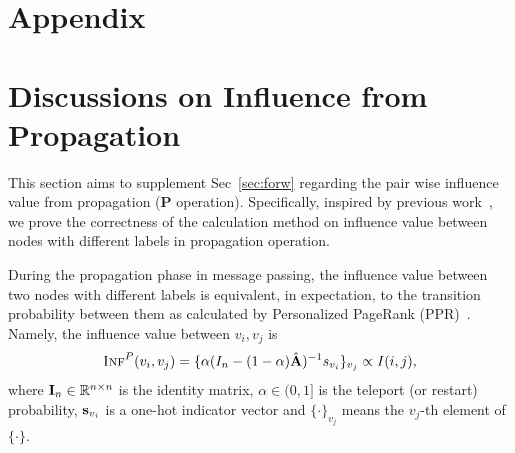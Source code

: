 \appendix
\section*{Appendix}

% 
\section{Discussions on Influence from Propagation} \label{app:theory}
This section aims to supplement Sec~\ref{sec:forw} regarding the pair wise influence value from propagation (\textbf{P} operation). 
Specifically, inspired by previous work~\citep{xu2018representation,wang2020unifying}, we prove the correctness of the calculation method on influence value between nodes with different labels in propagation operation. 

\begin{theorem}
During the propagation phase in message passing, the influence value between two nodes with different labels is equivalent, in expectation, to the transition probability between them as calculated by Personalized PageRank (PPR)~\citep{gasteiger2018predict,chen2021topology}. Namely, the influence value between $v_i, v_j$ is
\begin{eqnarray}
    \textsc{Inf}^{P}(v_i, v_j) = \{ \alpha (I_n - (1 - \alpha)\hat{\mathbf{A}})^{-1} s_{v_i} \}_{v_j} \propto I(i,j),
\end{eqnarray}
where $\mathbf{I}_n\in\mathbb{R}^{n\times n}$ is the identity matrix, $\alpha \in (0,1]$ is the teleport (or restart) probability, $\mathbf{s}_{v_i}$ is a one-hot indicator vector and  $\{ \cdot \}_{v_j}$ means the $v_j$-th element of $\{ \cdot \}$.
\end{theorem}

